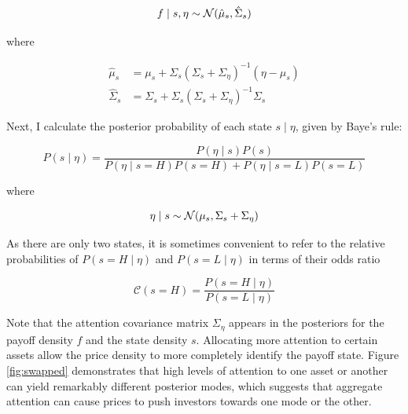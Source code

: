\documentclass{article}
\begin{document}
$$
f \mid s, \eta \sim \mathcal{N}(\hat \mu_s, \hat \Sigma_s)
$$

\noindent where 

\begin{align*}
    \hat \mu_s &= 
        \mu_s + \Sigma_s(\Sigma_s + \Sigma_\eta)^{-1} (\eta - \mu_s) \\
    \hat \Sigma_s &= 
        \Sigma_s + \Sigma_s(\Sigma_s + \Sigma_\eta)^{-1} \Sigma_s
\end{align*}

Next, I calculate the posterior probability of each state $s \mid \eta$, given by Baye's rule:

$$
P(s \mid \eta) = \frac{P(\eta \mid s) P(s)}{
    P(\eta \mid s=H)P(s=H) + P(\eta \mid s=L)P(s=L)
}
$$

where 

$$
\eta \mid s \sim \mathcal{N}(\mu_s, \Sigma_s + \Sigma_\eta)
$$

\noindent As there are only two states, it is sometimes convenient to refer to the relative probabilities of $P(s=H\mid \eta)$ and $P(s=L \mid \eta)$ in terms of their odds ratio

$$
\mathcal{C}(s=H) = \frac{P(s=H \mid \eta)}{P(s=L \mid \eta)}
$$

Note that the attention covariance matrix $\Sigma_\eta$ appears in the posteriors for the payoff density $f$ and the state density $s$. Allocating more attention to certain assets allow the price density to more completely identify the payoff state. Figure \ref{fig:swapped} demonstrates that high levels of attention to one asset or another can yield remarkably different posterior modes, which suggests that aggregate attention can cause prices to push investors towards one mode or the other.

\end{document}
